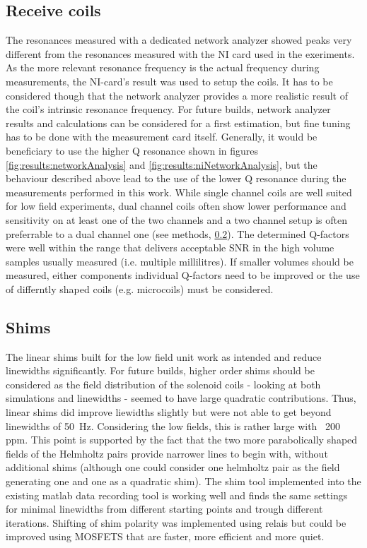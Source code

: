         \subsection{Receive coils}
            The resonances measured with a dedicated network analyzer showed peaks very different from the resonances measured with the NI card used in the exeriments. As the more relevant resonance frequency is the actual frequency during measurements, the NI-card's result was used to setup the coils. It has to be considered though that the network analyzer provides a more realistic result of the coil's intrinsic resonance frequency. For future builds, network analyzer results and calculations can be considered for a first estimation, but fine tuning has to be done with the measurement card itself. Generally, it would be beneficiary to use the higher Q resonance shown in figures \ref{fig:results:networkAnalysis} and \ref{fig:results:niNetworkAnalysis}, but the behaviour described above lead to the use of the lower Q resonance during the measurements performed in this work.
            While single channel coils are well suited for low field experiments, dual channel coils often show lower performance and sensitivity on at least one of the two channels and a two channel setup is often preferrable to a dual channel one (see methods, \ref{}). The determined Q-factors were well within the range that delivers acceptable SNR in the high volume samples usually measured (i.e. multiple millilitres). If smaller volumes should be measured, either components individual Q-factors need to be improved or the use of differntly shaped coils (e.g. microcoils) must be considered.
        \subsection{Shims}
            The linear shims built for the low field unit work as intended and reduce linewidths significantly. For future builds, higher order shims should be considered as the field distribution of the solenoid coils - looking at both simulations and linewidths - seemed to have large quadratic contributions. Thus, linear shims did improve liewidths slightly but were not able to get beyond linewidths of \SI{50}{\hertz}. Considering the low fields, this is rather large with ~200 ppm. This point is supported by the fact that the two more parabolically shaped fields of the Helmholtz pairs provide narrower lines to begin with, without additional shims (although one could consider one helmholtz pair as the field generating one and one as a quadratic shim). The shim tool implemented into the existing matlab data recording tool is working well and finds the same settings for minimal linewidths from different starting points and trough different iterations. Shifting of shim polarity was implemented using relais but could be improved using MOSFETS that are faster, more efficient and more quiet.
